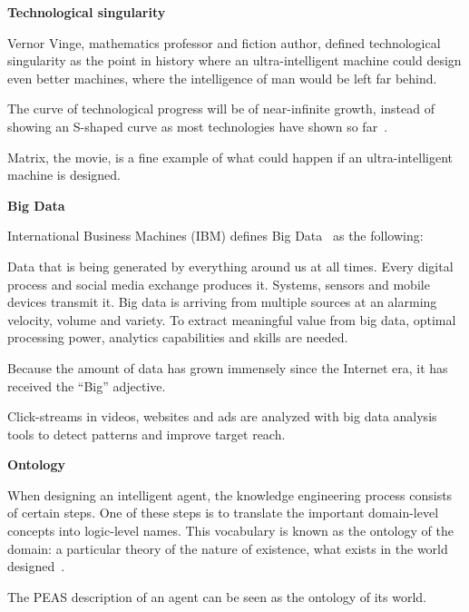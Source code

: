 \documentclass[titlepage, letterpaper, fleqn]{article}
\newcommand{\spacepls}{\vspace{5mm}}
\newcommand{\defys}[1]{
	\spacepls %
	\textbf{#1}
}
\begin{document}
\defys{Technological singularity}

Vernor Vinge, mathematics professor and fiction author, defined technological singularity as the point in history where an ultra-intelligent machine could design even better machines, where the intelligence of man would be left far behind.

The curve of technological progress will be of near-infinite growth, instead of showing an S-shaped curve as most technologies have shown so far~\cite{TechSing}.

Matrix, the movie, is a fine example of what could happen if an ultra-intelligent machine is designed.

\defys{Big Data}

International Business Machines (IBM) defines Big Data~\cite{Big} as the following:

\begin{displayquote}
    Data that is being generated by everything around us at all times.
    Every digital process and social media exchange produces it.
    Systems, sensors and mobile devices transmit it.
    Big data is arriving from multiple sources at an alarming velocity, volume and variety.
    To extract meaningful value from big data, optimal processing power, analytics capabilities and skills are needed.
\end{displayquote}

Because the amount of data has grown immensely since the Internet era, it has received the ``Big'' adjective.

Click-streams in videos, websites and ads are analyzed with big data analysis tools to detect patterns and improve target reach.

\defys{Ontology}

When designing an intelligent agent, the knowledge engineering process consists of certain steps.
One of these steps is to translate the important domain-level concepts into logic-level names.
This vocabulary is known as the ontology of the domain:
a particular theory of the nature of existence, what exists in the world designed~\cite{Onto}.

The PEAS description of an agent can be seen as the ontology of its world.


\end{document}
